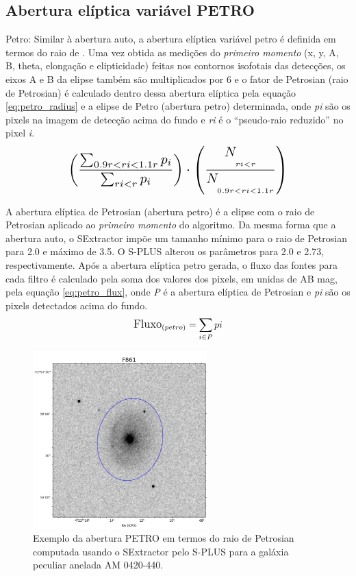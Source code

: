 \subsection{Abertura elíptica variável PETRO}
Petro: Similar à abertura auto, a abertura elíptica variável petro é definida em termos do raio de . Uma vez obtida as medições do \emph{primeiro momento} (x, y, A, B, theta, elongação e elipticidade) feitas nos contornos isofotais das detecções, os eixos A e B da elipse também são multiplicados por 6 e o fator de Petrosian (raio de Petrosian) é calculado dentro dessa abertura elíptica pela equação \ref{eq:petro_radius} e a elipse de Petro (abertura petro) determinada, onde \emph{pi} são os pixels na imagem de detecção acima do fundo e \emph{ri} é o ``pseudo-raio reduzido'' no pixel \emph{i}.
\begin{equation} \label{eq:petro_radius}
\scalebox{1.4}{$\displaystyle \left(\frac{\sum_{0.9r<ri<1.1r} p_i}{\sum_{ri<r} p_i}\right) \cdot \left(\frac{N_{\underset{ri<r}{\ }}}{N_{\underset{0.9r<ri<1.1r}{\ }}}\right)$}
\end{equation}

A abertura elíptica de Petrosian (abertura petro) é a elipse com o raio de Petrosian aplicado ao \emph{primeiro momento} do algoritmo. Da mesma forma que a abertura auto, o SExtractor impõe um tamanho mínimo para o raio de Petrosian para 2.0 e máximo de 3.5. O S-PLUS alterou os parâmetros para 2.0 e 2.73, respectivamente. Após a abertura elíptica petro gerada, o fluxo das fontes para cada filtro é calculado pela soma dos valores dos pixels, em unidas de AB mag, pela equação \ref{eq:petro_flux}, onde \emph{P} é a abertura elíptica de Petrosian e \emph{pi} são os pixels detectados acima do fundo. 
\begin{equation} \label{eq:petro_flux}
\large
\text{Fluxo}_{(petro)} = \sum_{i \in P} pi
\end{equation}

\begin{figure}[h]
  \centering 
  \includegraphics[width=0.6\textwidth]{Imagens/petro_exemplo.PNG} 
  \caption[Exemplo da abertura PETRO para a galáxia AM 0420-440.]{Exemplo da abertura PETRO em termos do raio de Petrosian computada usando o SExtractor pelo S-PLUS para a galáxia peculiar anelada AM 0420-440.}
  \label{fig:petro_exemplo} 
\end{figure}

